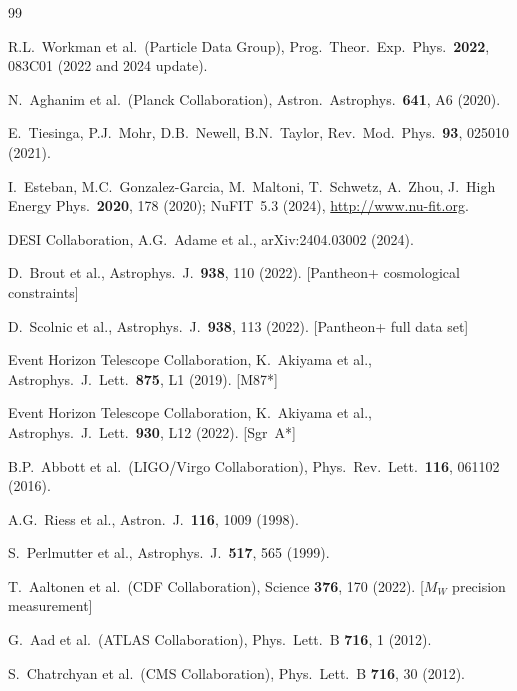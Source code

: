 \documentclass[12pt,a4paper]{article}
\begin{document}
\begin{thebibliography}{99}


 R.L.~Workman et al.\ (Particle Data Group), Prog.\ Theor.\ Exp.\ Phys.\ \textbf{2022}, 083C01 (2022 and 2024 update).

 N.~Aghanim et al.\ (Planck Collaboration), Astron.\ Astrophys.\ \textbf{641}, A6 (2020).

 E.~Tiesinga, P.J.~Mohr, D.B.~Newell, B.N.~Taylor, Rev.\ Mod.\ Phys.\ \textbf{93}, 025010 (2021).

 I.~Esteban, M.C.~Gonzalez-Garcia, M.~Maltoni, T.~Schwetz, A.~Zhou, J.\ High Energy Phys.\ \textbf{2020}, 178 (2020); NuFIT~5.3 (2024), \url{http://www.nu-fit.org}.

 DESI Collaboration, A.G.~Adame et al., arXiv:2404.03002 (2024).

 D.~Brout et al., Astrophys.\ J.\ \textbf{938}, 110 (2022). [Pantheon+ cosmological constraints]

 D.~Scolnic et al., Astrophys.\ J.\ \textbf{938}, 113 (2022). [Pantheon+ full data set]

 Event Horizon Telescope Collaboration, K.~Akiyama et al., Astrophys.\ J.\ Lett.\ \textbf{875}, L1 (2019). [M87*]

 Event Horizon Telescope Collaboration, K.~Akiyama et al., Astrophys.\ J.\ Lett.\ \textbf{930}, L12 (2022). [Sgr~A*]

 B.P.~Abbott et al.\ (LIGO/Virgo Collaboration), Phys.\ Rev.\ Lett.\ \textbf{116}, 061102 (2016).

 A.G.~Riess et al., Astron.\ J.\ \textbf{116}, 1009 (1998).

 S.~Perlmutter et al., Astrophys.\ J.\ \textbf{517}, 565 (1999).

 T.~Aaltonen et al.\ (CDF Collaboration), Science \textbf{376}, 170 (2022). [$M_W$ precision measurement]

 G.~Aad et al.\ (ATLAS Collaboration), Phys.\ Lett.\ B \textbf{716}, 1 (2012).

 S.~Chatrchyan et al.\ (CMS Collaboration), Phys.\ Lett.\ B \textbf{716}, 30 (2012).



\end{thebibliography}
\end{document}
